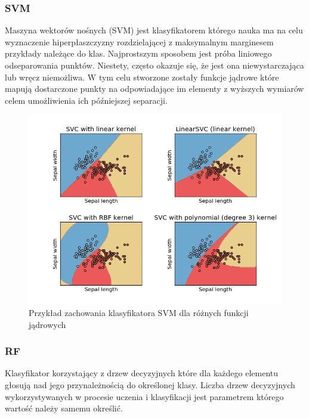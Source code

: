 \documentclass[a4paper]{report}
\begin{document}
\subsubsection{SVM}

Maszyna wektorów nośnych (SVM) jest klasyfikatorem którego nauka ma na celu wyznaczenie hiperpłaszczyzny rozdzielającej z maksymalnym marginesem przykłady należące do klas. Najprostszym sposobem jest próba liniowego odseparowania punktów. Niestety, często okazuje się, że jest ona niewystarczająca lub wręcz niemożliwa. W tym celu stworzone zostały funkcje jądrowe które mapują dostarczone punkty na odpowiadające im elementy z wyższych wymiarów celem umożliwienia ich późniejszej separacji. 

\begin{figure}[!htp]
	\centering
	\includegraphics[scale=0.6]{svm.png}
	\caption{Przykład zachowania klasyfikatora SVM dla różnych funkcji jądrowych}
	\label{svmfigure}
\end{figure}


\subsubsection{RF}
Klasyfikator korzystający z drzew decyzyjnych które dla każdego elementu głosują nad jego przynależnością do określonej klasy. Liczba drzew decyzyjnych wykorzystywanych w procesie uczenia i klasyfikacji jest parametrem którego wartość należy samemu określić.
\end{document}
